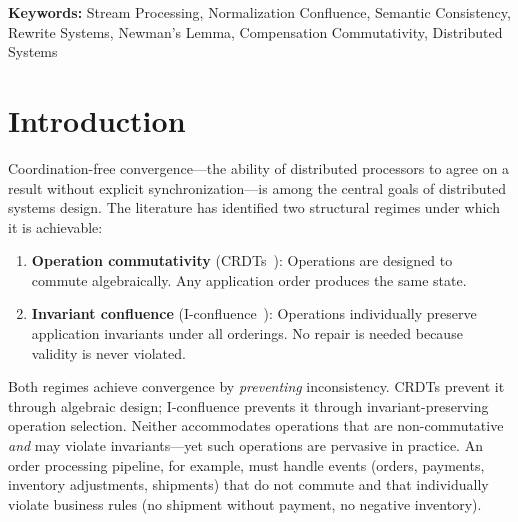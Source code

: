 \documentclass[11pt,a4paper]{article}
\theoremstyle{plain}
\theoremstyle{definition}
\theoremstyle{remark}
\begin{document}
\begin{abstract}
To make CC practically verifiable, we develop a \emph{verification calculus}
that reduces the global CC obligation to local checks.  An \emph{invariant
footprint} mapping identifies which invariants each event can affect, and a
\emph{decomposable repair} condition ensures per-invariant repairs commute.
Under decomposable repair, CC2 is equivalent to a per-event strong absorption
property, and CC1 for a pair reduces to commutation of the two events up to
normalization plus a per-event footprint absorption check; at valid states,
disjoint footprints and repair locality reduce CC1 to commutation up to
normalization alone.  A product composition theorem enables modular
verification of multi-registry systems.  The convergence theorems, their
exact converses, the calculus, and the paper's examples and counterexamples
are mechanized in Coq/Rocq, axiom-free.
\end{abstract}

\medskip\noindent\textbf{Keywords:} Stream Processing, Normalization
Confluence, Semantic Consistency, Rewrite Systems, Newman's Lemma,
Compensation Commutativity, Distributed Systems

\clearpage

\section{Introduction}
\label{sec:intro}

Coordination-free convergence---the ability of distributed processors to agree
on a result without explicit synchronization---is among the central goals of
distributed systems design.  The literature has identified two structural
regimes under which it is achievable:

\begin{enumerate}[leftmargin=*,nosep]
\item \textbf{Operation commutativity} (CRDTs~\cite{shapiro2011crdt}):
  Operations are designed to commute algebraically.  Any application order
  produces the same state.
\item \textbf{Invariant confluence}
  (I-confluence~\cite{bailis2014coordination}): Operations individually
  preserve application invariants under all orderings.  No repair is needed
  because validity is never violated.
\end{enumerate}

Both regimes achieve convergence by \emph{preventing} inconsistency.  CRDTs
prevent it through algebraic design; I-confluence prevents it through
invariant-preserving operation selection.  Neither accommodates operations that
are non-commutative \emph{and} may violate invariants---yet such operations
are pervasive in practice.  An order processing pipeline, for example, must
handle events (orders, payments, inventory adjustments, shipments) that do not
commute and that individually violate business rules (no shipment without
payment, no negative inventory).
\end{document}
